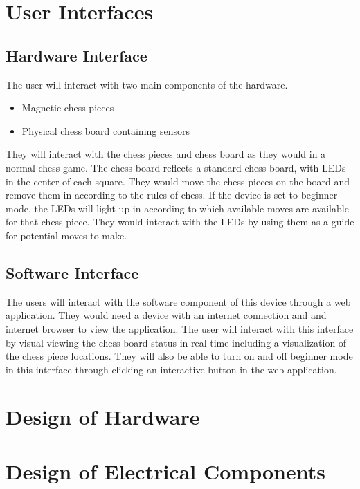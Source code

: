 \documentclass[12pt, titlepage]{article}
\begin{document}
\section{User Interfaces}

\subsection*{Hardware Interface}
The user will interact with two main components of the hardware.
\begin{itemize}
  \item Magnetic chess pieces
  \item Physical chess board containing sensors
\end{itemize}
They will interact with the chess pieces and chess board as they would in a normal chess game. The chess board reflects a standard chess board, with 
LEDs in the center of each square. They would move the chess pieces on the board and remove them in according to the rules of chess. If the device
is set to beginner mode, the LEDs will light up in according to which available moves are available for that chess piece. They would interact with the LEDs
by using them as a guide for potential moves to make.

\subsection*{Software Interface}
The users will interact with the software component of this device through a web application. They would need a device with an internet connection and and internet browser
to view the application. The user will interact with this interface by visual viewing the chess board status in real time including a visualization of the chess piece locations.
They will also be able to turn on and off beginner mode in this interface through clicking an interactive button in the web application. 

\section{Design of Hardware}


\section{Design of Electrical Components}
\end{document}
